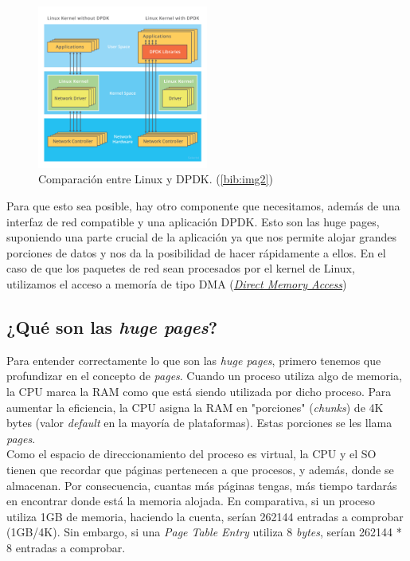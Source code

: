 \documentclass[12pt]{article}
\begin{document}
    \begin{figure}[h]
    	\begin{center}
    		\includegraphics[width=0.5\textwidth]{img/DPDK_Architecture.png}
    		\caption{Comparación entre Linux y DPDK. (\ref{bib:img2})}
    	\end{center}
    \end{figure}

	\noindent Para que esto sea posible, hay otro componente que necesitamos, además de una interfaz de red compatible y una aplicación DPDK. Esto son las huge pages, suponiendo una parte crucial de la aplicación ya que nos permite alojar grandes porciones de datos y nos da la posibilidad de hacer rápidamente a ellos. En el caso de que los paquetes de red sean procesados por el kernel de Linux, utilizamos el acceso a memoría de tipo DMA (\hyperref[bib:img2]{\emph{Direct Memory Access}}) 
	
    
    \pagebreak
    
    \subsection{¿Qué son las \emph{huge pages}?}
    \noindent Para entender correctamente lo que son las \emph{huge pages}, primero tenemos que profundizar en el concepto de \emph{pages}. Cuando un proceso utiliza algo de memoria, la CPU marca la RAM como que está siendo utilizada por dicho proceso. Para aumentar la eficiencia, la CPU asigna la RAM en "porciones" (\emph{chunks}) de 4K bytes (valor \emph{default} en la mayoría de plataformas). Estas porciones se les llama \emph{pages}.\\
    
    \noindent Como el espacio de direccionamiento del proceso es virtual, la CPU y el SO tienen que recordar que páginas pertenecen a que procesos, y además, donde se almacenan. Por consecuencia, cuantas más páginas tengas, más tiempo tardarás en encontrar donde está la memoria alojada. En comparativa, si un proceso utiliza 1GB de memoria, haciendo la cuenta, serían 262144 entradas a comprobar (1GB/4K). Sin embargo, si una \emph{Page Table Entry} utiliza 8 \emph{bytes}, serían 262144 * 8 entradas a comprobar.\\
    
\end{document}
